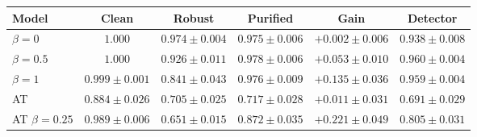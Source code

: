\begin{tabular}{lccccc}
\toprule
Model & Clean & Robust & Purified & Gain & Detector \\
\midrule
$\beta=0$ & $\mathbf{1.000}$ & $\mathbf{0.974 \pm 0.004}$ & $0.975 \pm 0.006$ & $+0.002 \pm 0.006$ & $0.938 \pm 0.008$ \\
$\beta=0.5$ & $\mathbf{1.000}$ & $0.926 \pm 0.011$ & $\mathbf{0.978 \pm 0.006}$ & $+0.053 \pm 0.010$ & $\mathbf{0.960 \pm 0.004}$ \\
$\beta=1$ & $0.999 \pm 0.001$ & $0.841 \pm 0.043$ & $0.976 \pm 0.009$ & $+0.135 \pm 0.036$ & $0.959 \pm 0.004$ \\
AT & $0.884 \pm 0.026$ & $0.705 \pm 0.025$ & $0.717 \pm 0.028$ & $+0.011 \pm 0.031$ & $0.691 \pm 0.029$ \\
AT $\beta=0.25$ & $0.989 \pm 0.006$ & $0.651 \pm 0.015$ & $0.872 \pm 0.035$ & $\mathbf{+0.221 \pm 0.049}$ & $0.805 \pm 0.031$ \\
\bottomrule
\end{tabular}
